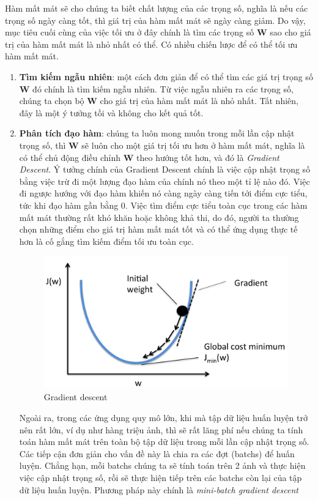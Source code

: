 Hàm mất mát sẽ cho chúng ta biết chất lượng của các trọng số, nghĩa là nếu các trọng số ngày càng tốt, thì giá trị của hàm mất mát sẽ ngày càng giảm. Do vậy, mục tiêu cuối cùng của việc tối ưu ở đây chính là tìm các trọng số \textbf{W} sao cho giá trị của hàm mất mát là nhỏ nhất có thể. Có nhiều chiến lược để có thể tối ưu hàm mất mát.
\begin{enumerate}
	\item \textbf{Tìm kiếm ngẫu nhiên}: một cách đơn giản để có thể tìm các giá trị trọng số \textbf{W} đó chính là tìm kiếm ngẫu nhiên. Từ việc ngẫu nhiên ra các trọng số, chúng ta chọn bộ \textbf{W} cho giá trị của hàm mất mát là nhỏ nhất. Tất nhiên, đây là một ý tưởng tồi và không cho kết quả tốt.
    \item \textbf{Phân tích đạo hàm}: chúng ta luôn mong muốn trong mỗi lần cập nhật trọng số, thì \textbf{W} sẽ luôn cho một giá trị tối ưu hơn ở hàm mất mát, nghĩa là có thể chủ động điều chỉnh \textbf{W} theo hướng tốt hơn, và đó là \textit{Gradient Descent}. Ý tưởng chính của Gradient Descent chính là việc cập nhật trọng số bằng việc trừ đi một lượng đạo hàm của chính nó theo một tỉ lệ nào đó. Việc đi ngược hướng với đạo hàm khiến nó càng ngày càng tiến tới điểm cực tiểu, tức khi đạo hàm gần bằng 0. Việc tìm điểm cực tiểu toàn cục trong các hàm mất mát thường rất khó khăn hoặc không khả thi, do đó, người ta thường chọn những điểm cho giá trị hàm mất mát tốt và có thể ứng dụng thực tế hơn là cố gắng tìm kiếm điểm tối ưu toàn cục. \\     
\begin{center}
    \begin{figure}[H]
    \begin{center}
     \includegraphics[scale=.15]{image/gradientdescent}
    \end{center}
    \caption{Gradient descent}
    \label{fig:gradientdescent}
    \end{figure}
\end{center}
 
Ngoài ra, trong các ứng dụng quy mô lớn, khi mà tập dữ liệu huấn luyện trở nên rất lớn, ví dụ như hàng triệu ảnh, thì sẽ rất lãng phí nếu chúng ta tính toán hàm mất mát trên toàn bộ tập dữ liệu trong mỗi lần cập nhật trọng số. Các tiếp cận đơn giản cho vấn đề này là chia ra các đợt (batchs) để huấn luyện. Chẳng hạn, mỗi batchs chúng ta sẽ tính toán trên 2 ảnh và thực hiện việc cập nhật trọng số, rồi sẽ thực hiện tiếp trên các batchs còn lại của tập dữ liệu huấn luyện. Phương pháp này chính là \textit{mini-batch gradient descent}
\end{enumerate}

